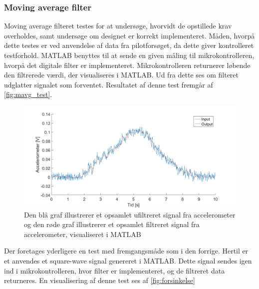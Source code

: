 \subsubsection{Moving average filter} \label{sec:mavg_test}
Moving average filteret testes for at undersøge, hvorvidt de opstillede krav overholdes, samt undersøge om designet er korrekt implementeret. Måden, hvorpå dette testes er ved anvendelse af data fra pilotforsøget, da dette giver kontrolleret testforhold. 
MATLAB benyttes til at sende en given måling til mikrokontrolleren, hvorpå det digitale filter er implementeret. Mikrokontrolleren returnerer løbende den filtrerede værdi, der visualiseres i MATLAB. Ud fra dette ses om filteret udglatter signalet som forventet. 
Resultatet af denne test fremgår af \autoref{fig:mavg_test}. 

\begin{figure}[H]
	\centering
	\includegraphics[width=1\textwidth]{figures/accelerometer_filter}
	\caption{Den blå graf illustrerer et opsamlet ufiltreret signal fra accelerometer og den røde graf illustrerer et opsamlet filtreret signal fra accelerometer, visualiseret i MATLAB}
	\label{fig:mavg_test}
\end{figure}

\noindent
Der foretages yderligere en test med fremgangsmåde som i den forrige. Hertil er et anvendes et square-wave signal genereret i MATLAB. Dette signal sendes igen ind i mikrokontrolleren, hvor filter er implementeret, og de filtreret data returneres. En visualisering af denne test ses af \autoref{fig:forsinkelse}

